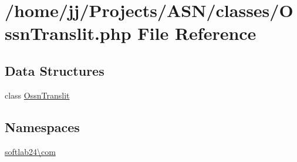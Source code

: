 \hypertarget{_ossn_translit_8php}{}\section{/home/jj/\+Projects/\+A\+S\+N/classes/\+Ossn\+Translit.php File Reference}
\label{_ossn_translit_8php}
\subsection*{Data Structures}
\begin{DoxyCompactItemize}
\item 
class \hyperlink{class_ossn_translit}{Ossn\+Translit}
\end{DoxyCompactItemize}
\subsection*{Namespaces}
\begin{DoxyCompactItemize}
\item 
 \hyperlink{namespacesoftlab24_1_1com}{softlab24\textbackslash{}com}
\end{DoxyCompactItemize}
